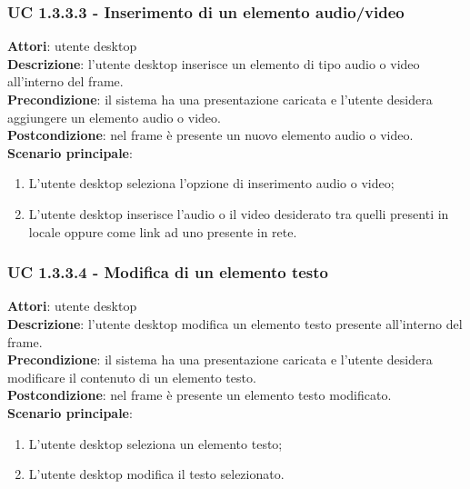 \subsubsection{UC 1.3.3.3 - Inserimento di un elemento audio/video}{
	\label{uc1.3.3.3}
	\textbf{Attori}: utente desktop \\
	\textbf{Descrizione}: l'utente desktop inserisce un elemento di tipo audio o video all'interno del frame. \\
	\textbf{Precondizione}: il sistema ha una presentazione caricata e l'utente desidera aggiungere un elemento audio o video.	\\
	\textbf{Postcondizione}: nel frame è presente un nuovo elemento audio o video.	\\
	\textbf{Scenario principale}:
	\begin{enumerate}
		\item L'utente desktop seleziona l'opzione di inserimento audio o video;
		\item L'utente desktop inserisce l'audio o il video desiderato tra quelli presenti in locale oppure come link ad uno presente in rete.
	\end{enumerate}
	}
\subsubsection{UC 1.3.3.4 - Modifica di un elemento testo}{
	\label{uc1.3.3.4}
	\textbf{Attori}: utente desktop \\
	\textbf{Descrizione}: l'utente desktop modifica un elemento testo presente all'interno del frame. \\
	\textbf{Precondizione}: il sistema ha una presentazione caricata e l'utente desidera modificare il contenuto di un elemento testo.	\\
	\textbf{Postcondizione}: nel frame è presente un elemento testo modificato.	\\
	\textbf{Scenario principale}:
	\begin{enumerate}
		\item L'utente desktop seleziona un elemento testo;
		\item L'utente desktop modifica il testo selezionato.
	\end{enumerate}
	}
